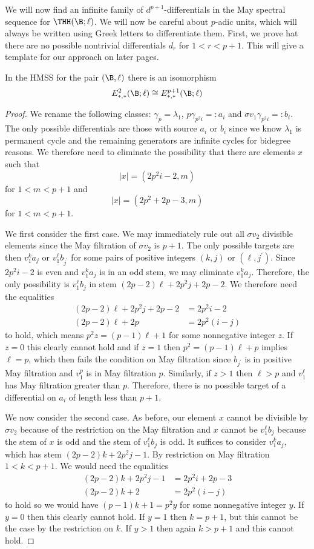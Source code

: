 We will now find an infinite family of $d^{p+1}$-differentials in the May spectral sequence for $\THH(\B;\ell)$. We will now be careful about $p$-adic units, which will always be written using Greek letters to differentiate them. First, we prove hat there are no possible nontrivial differentials $d_r$ for $1<r<p+1$. This will give a template for our approach on later pages. 
\begin{lem}
In the HMSS for the pair $(\B,\ell)$ there is an isomorphism
\[ E_{*,*}^{2}(\B;\ell) \cong E_{*,*}^{p+1}(\B;\ell)\]
\end{lem}
\begin{proof}
We rename the following classes: $\gamma_p=\lambda_1$, $p\gamma_{p^2i}=:a_i$ and $\sigma v_1 \gamma_{p^2i}=:b_i$. The only possible differentials are those with source $a_i$ or $b_i$  since we know $\lambda_1$ is  permanent cycle and the remaining generators are infinite cycles for bidegree reasons. We therefore need to eliminate the possibility that there are elements $x$ such that 
\[ |x|=(2p^2i-2,m)\]
for $1<m<p+1$ and 
\[ |x|=(2p^2+2p-3,m)\]
for $1<m<p+1$. 

We first consider the first case. We may immediately rule out all $\sigma v_2$ divisible elements since the May filtration of $\sigma v_2$ is $p+1$. The only possible targets are then 
$v_1^ka_j$ or $v_1^\ell b_{j^{\prime}}$ for some pairs of positive integers $(k,j)$ or $(\ell,j^{\prime})$. Since $2p^2i-2$ is even and $v_1^ka_j$ is in an odd stem, we may eliminate $v_1^ka_j$. Therefore, the only possibility is $v_1^{\ell}b_j$ in stem $(2p-2)\ell+2p^2j+2p-2$. We therefore need the equalities
\begin{align*}
(2p-2)\ell+2p^2j+2p-2&=2p^2i-2\\
(2p-2)\ell+2p&=2p^2(i-j)
\end{align*}
to hold, which means $p^2z=(p-1)\ell+1$ for some nonnegative integer $z$. If $z=0$ this clearly cannot hold and if $z=1$ then $p^2=(p-1)\ell+p$ implies $\ell=p$, which then fails the condition on May filtration since $b_{j^\prime}$ is in positive May filtration and $v_1^p$ is in May filtration $p$. Similarly, if $z>1$ then $\ell>p$ and $v_1^\ell$ has May filtration greater than $p$. Therefore, there is no possible target of a differential on $a_i$ of length less than $p+1$.

We now consider the second case. As before, our element $x$ cannot be divisible by $\sigma v_2$ because of the restriction on the May filtration and $x$ cannot be $v_1^{\ell}b_j$ because the stem of $x$ is odd and the stem of $v_1^{\ell}b_j$ is odd. It suffices to consider $v_1^ka_j$, which has stem $(2p-2)k+2p^2j-1$. By restriction on May filtration $1<k<p+1$. We would need the equalities 
\begin{align*}
(2p-2)k+2p^2j-1&=2p^2i+2p-3\\
(2p-2)k+2&=2p^2(i-j)
\end{align*}
to hold so we would have $(p-1)k+1=p^2y$ for some nonnegative integer $y$. If $y=0$ then this clearly cannot hold. If $y=1$ then $k=p+1$, but this cannot be the case by the restriction on $k$. If $y>1$ then again $k>p+1$ and this cannot hold. 
\end{proof}
